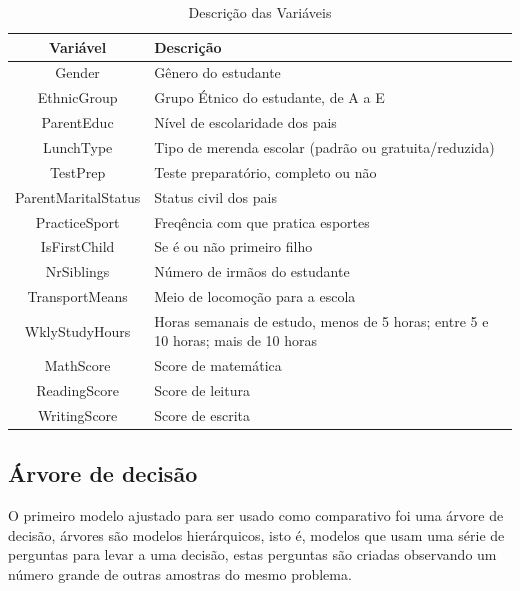 \begin{table}[htbp]
    \centering
    \caption{Descrição das Variáveis}
    \begin{tabular}{|c|p{8cm}|}
        \hline
        \textbf{Variável} & \textbf{Descrição} \\
        \hline
        Gender & Gênero do estudante \\
        \hline
        EthnicGroup & Grupo Étnico do estudante, de A a E \\
        \hline
        ParentEduc & Nível de escolaridade dos pais \\
        \hline
        LunchType & Tipo de merenda escolar (padrão ou gratuita/reduzida) \\
        \hline
        TestPrep & Teste preparatório, completo ou não \\
        \hline
        ParentMaritalStatus & Status civil dos pais \\
        \hline
        PracticeSport & Freqência com que pratica esportes \\
        \hline
        IsFirstChild & Se é ou não primeiro filho \\
        \hline
        NrSiblings & Número de irmãos do estudante \\
        \hline
        TransportMeans & Meio de locomoção para a escola \\
        \hline
        WklyStudyHours & Horas semanais de estudo, menos de 5 horas; entre 5 e 10 horas; mais de 10 horas \\
        \hline
        MathScore & Score de matemática\\
        \hline
        ReadingScore & Score de leitura \\
        \hline
        WritingScore & Score de escrita \\
        \hline
    \end{tabular}
    \label{tab:variaveis}
\end{table}

\newpage
\subsection{Árvore de decisão}

O primeiro modelo ajustado para ser usado como comparativo foi uma árvore de decisão, árvores são modelos hierárquicos, isto é, modelos que usam uma série de perguntas para levar a uma decisão, estas perguntas são criadas observando um número grande de outras amostras do mesmo problema\cite{arvore}.

